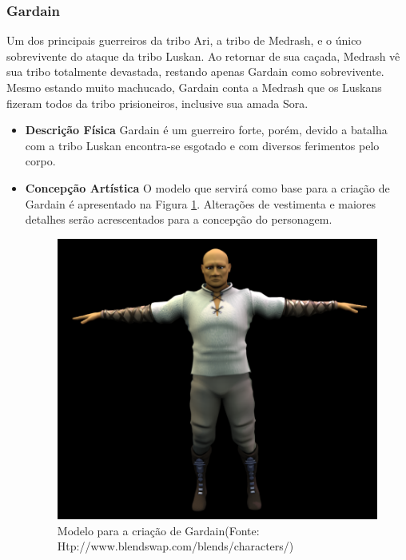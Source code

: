 \subsubsection{Gardain}
Um dos principais guerreiros da tribo Ari, a tribo de Medrash, e o único
 sobrevivente do ataque da tribo Luskan. Ao retornar de sua caçada, Medrash
 vê sua tribo totalmente devastada, restando apenas Gardain como
 sobrevivente. Mesmo estando muito machucado, Gardain conta a Medrash que
 os Luskans fizeram todos da tribo prisioneiros, inclusive sua amada Sora. 
\begin{itemize}
\item {\bf Descrição Física}
Gardain é um guerreiro forte, porém, devido a batalha com a tribo Luskan
 encontra-se esgotado e com diversos ferimentos pelo corpo.
\item {\bf Concepção Artística}
O modelo que servirá como base para a criação de Gardain é apresentado na
 Figura \ref{img:gardain}. Alterações de vestimenta e maiores detalhes
 serão acrescentados para a concepção do personagem.

\begin{figure}[H]
 \centering
 \includegraphics[scale=1]{Imagens/gardain01.png}
 \caption{Modelo para a criação de Gardain(Fonte: Htp://www.blendswap.com/blends/characters/)}
\label{img:gardain}
\end{figure}


\end{itemize}
